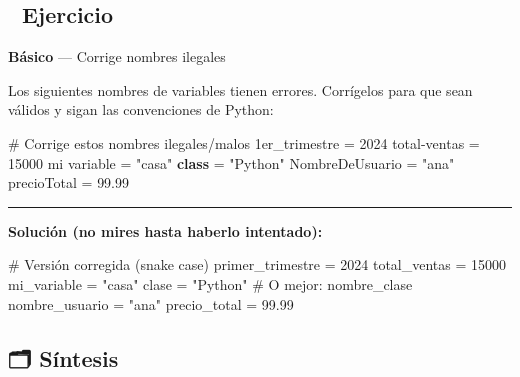 \documentclass[
  doc,
  floatsintext,
  longtable,
  a4paper,
  nolmodern,
  notxfonts,
  notimes,
  12pt,
  colorlinks=true,linkcolor=blue,citecolor=blue,urlcolor=blue]{apa7}
\newenvironment{Shaded}{\begin{snugshade}}{\end{snugshade}}
\newcommand{\CommentTok}[1]{\textcolor[rgb]{0.37,0.37,0.37}{#1}}
\newcommand{\DecValTok}[1]{\textcolor[rgb]{0.68,0.00,0.00}{#1}}
\newcommand{\ErrorTok}[1]{\textcolor[rgb]{0.68,0.00,0.00}{#1}}
\newcommand{\FloatTok}[1]{\textcolor[rgb]{0.68,0.00,0.00}{#1}}
\newcommand{\KeywordTok}[1]{\textcolor[rgb]{0.00,0.23,0.31}{\textbf{#1}}}
\newcommand{\NormalTok}[1]{\textcolor[rgb]{0.00,0.23,0.31}{#1}}
\newcommand{\OperatorTok}[1]{\textcolor[rgb]{0.37,0.37,0.37}{#1}}
\newcommand{\StringTok}[1]{\textcolor[rgb]{0.13,0.47,0.30}{#1}}
\begin{document}
\subsection{📝 Ejercicio}\label{ejercicio}

\textbf{Básico} --- Corrige nombres ilegales

Los siguientes nombres de variables tienen errores. Corrígelos para que
sean válidos y sigan las convenciones de Python:

\begin{Shaded}
\begin{Highlighting}[]
\CommentTok{\# Corrige estos nombres ilegales/malos}
\DecValTok{1}\ErrorTok{er\_trimestre} \OperatorTok{=} \DecValTok{2024}
\NormalTok{total}\OperatorTok{{-}}\NormalTok{ventas }\OperatorTok{=} \DecValTok{15000}
\NormalTok{mi variable }\OperatorTok{=} \StringTok{"casa"}
\KeywordTok{class} \OperatorTok{=} \StringTok{"Python"}
\NormalTok{NombreDeUsuario }\OperatorTok{=} \StringTok{"ana"}
\NormalTok{precioTotal }\OperatorTok{=} \FloatTok{99.99}
\end{Highlighting}
\end{Shaded}

\begin{center}\rule{0.5\linewidth}{0.5pt}\end{center}

\textbf{Solución (no mires hasta haberlo intentado):}

\begin{Shaded}
\begin{Highlighting}[]
\CommentTok{\# Versión corregida (snake case)}
\NormalTok{primer\_trimestre }\OperatorTok{=} \DecValTok{2024}
\NormalTok{total\_ventas }\OperatorTok{=} \DecValTok{15000}
\NormalTok{mi\_variable }\OperatorTok{=} \StringTok{"casa"}
\NormalTok{clase }\OperatorTok{=} \StringTok{"Python"}  \CommentTok{\# O mejor: nombre\_clase}
\NormalTok{nombre\_usuario }\OperatorTok{=} \StringTok{"ana"}
\NormalTok{precio\_total }\OperatorTok{=} \FloatTok{99.99}
\end{Highlighting}
\end{Shaded}

\subsection{🗂️ Síntesis}\label{suxedntesis}
\end{document}
